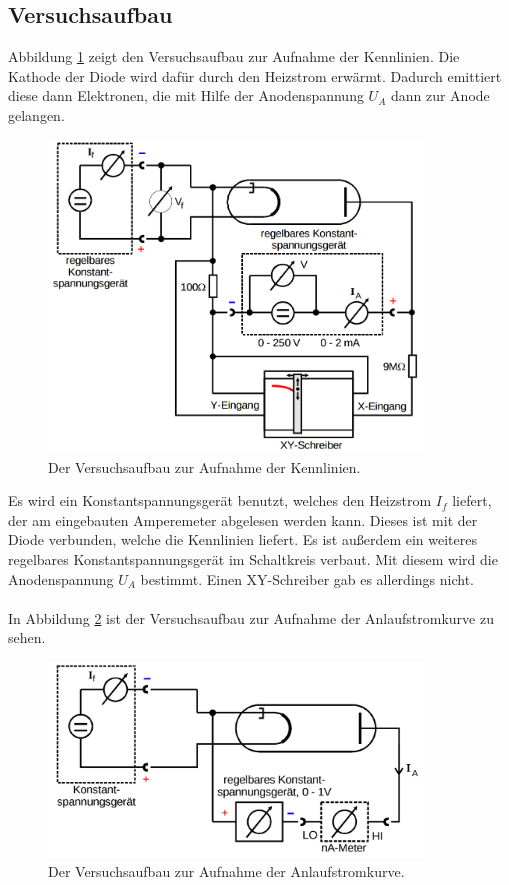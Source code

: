 \documentclass[
  bibliography=totoc,     %
  captions=tableheading,  %
  titlepage=firstiscover, %
]{scrartcl}
\begin{document}
\subsection{Versuchsaufbau}
\label{sec:aufbau}
Abbildung \ref{fig:V5041} zeigt den Versuchsaufbau zur Aufnahme der Kennlinien.
Die Kathode der Diode wird dafür durch den Heizstrom erwärmt. Dadurch emittiert diese dann Elektronen, die mit Hilfe der Anodenspannung $U_A$ dann zur Anode gelangen.
\begin{figure}[H]
  \centering
  \includegraphics[width=0.9\textwidth]{V5041.png}
  \caption{Der Versuchsaufbau zur Aufnahme der Kennlinien. \cite{anleitung}}
  \label{fig:V5041}
\end{figure}
\noindent
Es wird ein Konstantspannungsgerät benutzt, welches den Heizstrom $I_f$ liefert, der am eingebauten Amperemeter abgelesen werden kann. Dieses ist mit der Diode verbunden, welche die Kennlinien liefert. Es ist außerdem ein weiteres regelbares Konstantspannungsgerät im Schaltkreis verbaut. Mit diesem wird die Anodenspannung $U_A$ bestimmt. Einen XY-Schreiber gab es allerdings nicht.\\
\\
In Abbildung \ref{fig:V5042} ist der Versuchsaufbau zur Aufnahme der Anlaufstromkurve zu sehen.
\begin{figure}[H]
  \centering
  \includegraphics[width=0.9\textwidth]{V5042.png}
  \caption{Der Versuchsaufbau zur Aufnahme der Anlaufstromkurve. \cite{anleitung}}
  \label{fig:V5042}
\end{figure}
\end{document}
